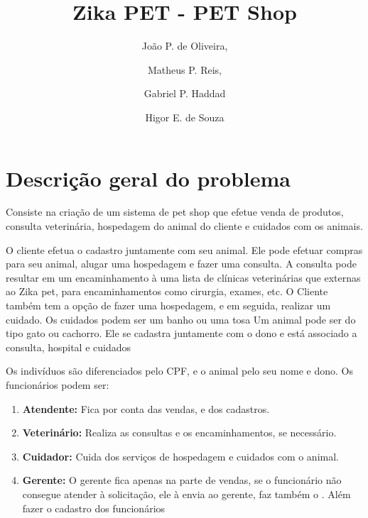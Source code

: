 \documentclass[12pt]{article}
\title{Zika PET - PET Shop}
\author{
	João P. de Oliveira,
    \and
    Matheus P. Reis,
    \and
    Gabriel P. Haddad
    \and
    Higor E. de Souza
}
\begin{document}
  \maketitle               %
  \newpage                 %

 
 \section{Descrição geral do problema}
 Consiste na criação de um sistema de pet shop que efetue venda de produtos, consulta veterinária, hospedagem do animal do cliente e cuidados com os animais.
 
 O cliente efetua o cadastro juntamente com seu animal. Ele pode efetuar compras para seu animal, alugar uma hospedagem e fazer uma consulta. A consulta pode resultar em um encaminhamento à uma lista de clínicas veterinárias que externas ao Zika pet, para encaminhamentos como cirurgia, exames, etc. 
 O Cliente também tem a opção de fazer uma hospedagem, e em seguida, realizar um cuidado. Os cuidados podem ser um banho ou uma tosa 
 Um animal pode ser do tipo gato ou cachorro. Ele se cadastra juntamente com o  dono e está associado a consulta, hospital e cuidados
 
 Os indivíduos são diferenciados pelo CPF, e o animal pelo seu nome e dono. Os funcionários podem ser:
 
\begin{enumerate}
\item \textbf{Atendente:} Fica por conta das vendas, e dos cadastros.

\item \textbf{Veterinário:} Realiza as consultas e os encaminhamentos, se necessário.

\item \textbf{Cuidador:} Cuida dos serviços de hospedagem e cuidados com o animal.

\item \textbf{Gerente:} O gerente fica apenas na parte de vendas, se o funcionário não consegue atender à solicitação, ele à envia ao gerente, faz também o . Além fazer o cadastro dos funcionários
\end{enumerate}
 
\end{document}

